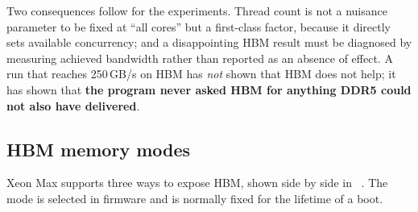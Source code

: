 Two consequences follow for the experiments.  Thread count is not a
nuisance parameter to be fixed at ``all cores'' but a first-class
factor, because it directly sets available concurrency; and a
disappointing HBM result must be diagnosed by measuring achieved
bandwidth rather than reported as an absence of effect.  A run that
reaches 250\,GB/s on HBM has \emph{not} shown that HBM does not help;
it has shown that \textbf{the program never asked HBM for anything DDR5
could not also have delivered}.

\subsection{HBM memory modes}
\label{sec:hbm-modes}

Xeon Max supports three ways to expose HBM, shown side by side in
~\cite{lp1603,intelmaxtuning}.  The mode is
selected in firmware and is normally fixed for the lifetime of a boot.


